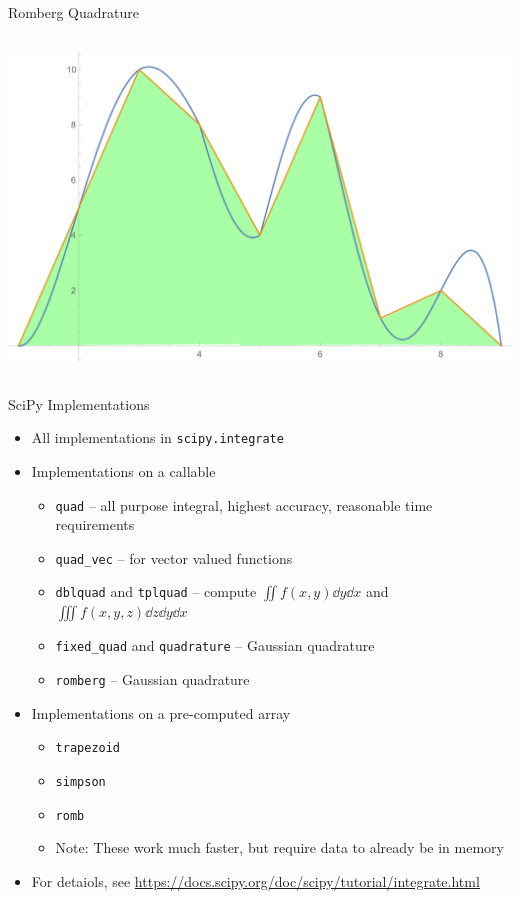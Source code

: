 \begin{frame}{Romberg Quadrature}
\begin{columns}
\includegraphics[width=\linewidth]{./gfx/03-romberg-03}
\end{columns}
%
\end{frame}


\begin{frame}{SciPy Implementations}
%
\begin{itemize}
\item All implementations in \texttt{scipy.integrate}
\item Implementations on a callable
	\begin{itemize}
	\item \texttt{quad} -- all purpose integral, highest accuracy, reasonable time requirements
	\item \texttt{quad\_vec} -- for vector valued functions
	\item \texttt{dblquad} and \texttt{tplquad} -- compute $\iint f(x, y) \dd{y}\dd{x}$ and $\iiint f(x, y, z) \dd{z}\dd{y}\dd{x}$
	\item \texttt{fixed\_quad} and \texttt{quadrature} -- Gaussian quadrature
	\item \texttt{romberg} -- Gaussian quadrature
	\end{itemize}
\item Implementations on a pre-computed array
	\begin{itemize}
	\item \texttt{trapezoid}
	\item \texttt{simpson}
	\item \texttt{romb}
	\item Note: These work much faster, but require data to already be in memory
	\end{itemize}
\item For detaiols, see \url{https://docs.scipy.org/doc/scipy/tutorial/integrate.html} 
\end{itemize}
%
\end{frame}

